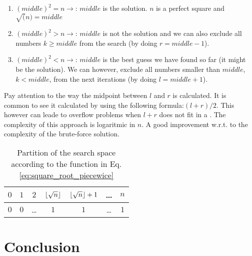\begin{enumerate}
 	\item $(middle)^2  = n \longrightarrow$: $middle$ is the solution. $n$ is a perfect square and
 	$\sqrt(n)=middle$
 	\item $(middle)^2  > n \longrightarrow$: $middle$ is not the solution and we can also exclude
 	all numbers $k \geq middle$ from the search (by doing $r = middle-1$).
 	\item $(middle)^2  < n \longrightarrow$: $middle$ is the best guess we have found so far (it might be the solution). We can
 	however, exclude all numbers smaller than $middle$, $k < middle$, from the next iterations (by doing $l = middle+1$).
\end{enumerate}
Pay attention to the way the midpoint between $l$ and $r$ is calculated. 
It is common to see it calculated by using the following formula:$(l+r)/2$. This however can leade to overflow problems when $l+r$ does not fit in a .
The complexity of this approach is logaritmic in $n$. A good improvement w.r.t. to the complexity of the brute-force solution.

\begin{table}
	\centering
	\begin{tabular}{|c|c|c|c|c|c|c|}
		\hline
		$0$ & $1$ & $2$   & $\lfloor\sqrt{n}\rfloor$ & $\lfloor\sqrt{n}\rfloor+1$ & \ldots   & $n$ \\ \hline
		$0$ & $0$ & \ldots & $1$ & $1$ & \ldots & $1$   \\ \hline
	\end{tabular}
	\caption{Partition of the search space according to the function in Eq.
	\ref{eq:square_root_piecewice}}
	\label{tab:sqrt_split_space}
\end{table}

\begin{minipage}{\linewidth}
	
\end{minipage}


\section{Conclusion}
